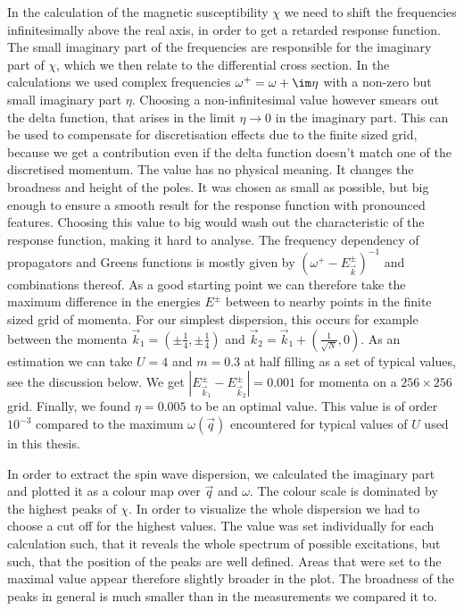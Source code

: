\documentclass[a4paper,12pt]{report}
\begin{document}
In the calculation of the magnetic susceptibility $\chi$ we need to shift the frequencies infinitesimally above the real axis, 
in order to get a retarded response function. 
The small imaginary part of the frequencies are responsible for the imaginary part of $\chi$, which we then relate to the differential cross section. 
In the calculations we used complex frequencies $\omega^+ = \omega + \im \eta$ with a non-zero but small imaginary part $\eta$. 
Choosing a non-infinitesimal value however smears out the delta function, that arises in the limit $\eta \rightarrow 0$ in the imaginary part.
This can be used to compensate for discretisation effects due to the finite sized grid, because we get a contribution even if the delta function 
doesn't match one of the discretised momentum.
%
The value has no physical meaning. It changes the broadness and height of the poles. 
It was chosen as small as possible, but big enough to ensure a smooth result for the response function with pronounced features.
Choosing this value to big would wash out the characteristic of the response function, making it hard to analyse.
The frequency dependency of propagators and Greens functions is mostly given by $(\omega^+-E^{\pm}_{\vec k})^{-1}$ and combinations thereof.
As a good starting point we can therefore take the maximum difference in the energies $E^{\pm}$ between to nearby points in the finite sized grid of momenta.
For our simplest dispersion, this occurs for example  between the momenta $\vec k_1 = (\pm \frac14,\pm\frac14)$ and $\vec k_2 = \vec k_1 + (\frac1{\sqrt{N}},0)$.
As an estimation we can take $U=4$ and $m=0.3$ at half filling as a set of typical values, see the discussion below.
We get $|E^{\pm}_{\vec k_1} - E^{\pm}_{\vec k_2}| = 0.001$ for momenta on a $256\times256$ grid.
Finally, we found $\eta=0.005$ to be an optimal value.
This value is of order $10^{-3}$ compared to the maximum $\omega(\vec q)$ encountered for typical values of $U$ used in this thesis.

In order to extract the spin wave dispersion, we calculated the imaginary part and plotted it as 
a colour map over $\vec q$ and $\omega$. 
The colour scale is dominated by the highest peaks of $\chi$.
In order to visualize the whole dispersion we had to choose a cut off for the highest values. 
The value was set individually for each calculation such, that it reveals the whole spectrum of possible excitations,
but such, that the position of the peaks are well defined. 
Areas that were set to the maximal value appear therefore slightly broader in the plot. 
The broadness of the peaks in general is much smaller than in the measurements we compared it to. 
\end{document}

